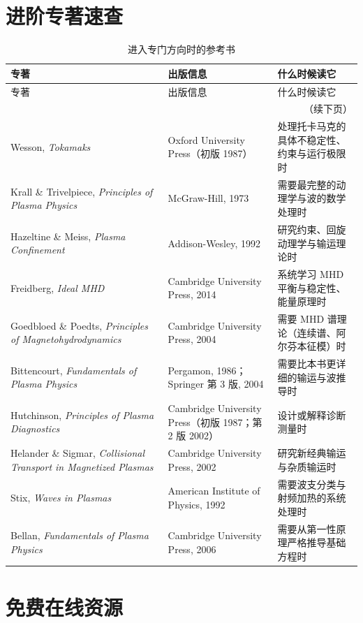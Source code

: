 \section{进阶专著速查}

{\small
\begin{longtable}{@{}p{4.4cm}p{5.2cm}p{4.9cm}@{}}
\caption{进入专门方向时的参考书}\label{tab:app-j-advanced}\\
\toprule
专著 & 出版信息 & 什么时候读它 \\
\midrule
\endfirsthead
\toprule
专著 & 出版信息 & 什么时候读它 \\
\midrule
\endhead
\midrule
\multicolumn{3}{r}{\small（续下页）}\\
\endfoot
\bottomrule
\endlastfoot
Wesson, \textit{Tokamaks} & Oxford University Press（初版 1987） & 处理托卡马克的具体不稳定性、约束与运行极限时 \\
Krall \& Trivelpiece, \textit{Principles of Plasma Physics} & McGraw-Hill, 1973 & 需要最完整的动理学与波的数学处理时 \\
Hazeltine \& Meiss, \textit{Plasma Confinement} & Addison-Wesley, 1992 & 研究约束、回旋动理学与输运理论时 \\
Freidberg, \textit{Ideal MHD} & Cambridge University Press, 2014 & 系统学习 MHD 平衡与稳定性、能量原理时 \\
Goedbloed \& Poedts, \textit{Principles of Magnetohydrodynamics} & Cambridge University Press, 2004 & 需要 MHD 谱理论（连续谱、阿尔芬本征模）时 \\
Bittencourt, \textit{Fundamentals of Plasma Physics} & Pergamon, 1986；Springer 第 3 版, 2004 & 需要比本书更详细的输运与波推导时 \\
Hutchinson, \textit{Principles of Plasma Diagnostics} & Cambridge University Press（初版 1987；第 2 版 2002） & 设计或解释诊断测量时 \\
Helander \& Sigmar, \textit{Collisional Transport in Magnetized Plasmas} & Cambridge University Press, 2002 & 研究新经典输运与杂质输运时 \\
Stix, \textit{Waves in Plasmas} & American Institute of Physics, 1992 & 需要波支分类与射频加热的系统处理时 \\
Bellan, \textit{Fundamentals of Plasma Physics} & Cambridge University Press, 2006 & 需要从第一性原理严格推导基础方程时 \\
\end{longtable}
}


\section{免费在线资源}

